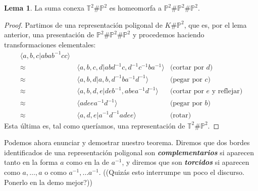\documentclass[10pt]{report}
\newcommand{\Toro}{\mathbb{T}^2}
\newcommand{\Proyectivo}{\mathbb{P}^2}
\newcommand{\enfatiza}[1]{\textbf{\textit{#1}}}
\theoremstyle{definition}
\newtheorem{lema}[defin]{Lema}
\begin{document}
\begin{lema}\label{lema:toro_proyectivo}
La suma conexa $\Toro \# \Proyectivo$ es homeomorfa a $\Proyectivo \# \Proyectivo \# \Proyectivo$.
\end{lema}
\begin{proof}
Partimos de una representación poligonal de $K\# \Proyectivo$, que es, por el lema anterior, una presentación de $\Proyectivo \# \Proyectivo \# \Proyectivo$ y procedemos haciendo transformaciones elementales:
\begin{align*}
\langle a,b,c | abab^{-1}cc \rangle &&\\
\approx &\, \langle a,b,c,d | abd^{-1}c,d^{-1}c^{-1}ba^{-1} \rangle &\text{(cortar por } d\text{)}\\
\approx &\, \langle a,b,d | a,b,d^{-1}ba^{-1}d^{-1}\rangle & \text{(pegar por } c\text{)}\\
\approx &\, \langle a,b,d,e | deb^{-1}, abea^{-1}d^{-1}\rangle & \text{(cortar por }e\text{ y reflejar)}\\
\approx &\, \langle adeea^{-1}d^{-1}\rangle & \text{(pegar por } b \text{)} \\
\approx  &\, \langle a,d,e | a^{-1}d^{-1}adee\rangle & \text{(rotar)}
\end{align*}
Esta última es, tal como queríamos, una representación de $\Toro \# \Proyectivo$.
\end{proof}

Podemos ahora enunciar y demostrar nuestro teorema. Diremos que dos bordes identificados de una representación poligonal son \enfatiza{complementarios} si aparecen tanto en la forma $a$ como en la de $a^{-1}$, y diremos que son \enfatiza{torcidos} si aparecen como $a,\dots ,a$ o como $a^{-1},\dots a^{-1}$. ((Quizás esto interrumpe un poco el discurso. Ponerlo en la demo mejor?))
\end{document}
